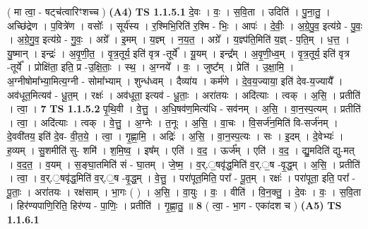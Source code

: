 \documentclass[17pt]{extarticle}
\begin{document}
                  \newline
                      ( मा त्वा॒ - षट्च॑त्वारिꣳशच्च )  \textbf{(A4)} \newline \newline
                                \textbf{ TS 1.1.5.1} \newline
                  दे॒वः । वः॒ । स॒वि॒ता । उदिति॑ । पु॒ना॒तु॒ । अच्छि॑द्रेण । प॒वित्रे॑ण । वसोः᳚ । सूर्य॑स्य । र॒श्मिभि॒रिति॑ र॒श्मि - भिः॒ । आपः॑ । दे॒वीः॒ । अ॒ग्रे॒पु॒व॒ इत्य॑ग्रे - पु॒वः॒ । अ॒ग्रे॒गु॒व॒ इत्य॑ग्रे - गु॒वः॒ । अग्रे᳚ । इ॒मम् । य॒ज्ञ्म् । न॒य॒त॒ । अग्रे᳚ । य॒ज्ञ्प॑ति॒मिति॑ य॒ज्ञ् - प॒ति॒म् । ध॒त्त॒ । यु॒ष्मान् । इन्द्रः॑ । अ॒वृ॒णी॒त॒ । वृ॒त्र॒तूर्य॒ इति॑ वृत्र -तूर्ये᳚ । यू॒यम् । इन्द्र᳚म् । अ॒वृ॒णी॒ध्व॒म् । वृ॒त्र॒तूर्य॒ इति॑ वृत्र -तूर्ये᳚ । प्रोक्षि॑ता॒ इति॒ प्र -उ॒क्षि॒ताः॒ । स्थ॒ । अ॒ग्नये᳚ । वः॒ । जुष्ट᳚म् । प्रेति॑ । उ॒क्षा॒मि॒ । अ॒ग्नीषोमा᳚भ्या॒मित्य॒ग्नी - सोमा᳚भ्याम् । शुन्ध॑ध्वम् । दैव्या॑य । कर्म॑णे । दे॒व॒य॒ज्याया॒ इति॑ देव-य॒ज्यायै᳚ । अव॑धूत॒मित्यव॑ - धू॒त॒म् । रक्षः॑ । अव॑धूता॒ इत्यव॑ - धू॒ताः॒ । अरा॑तयः । अदि॑त्याः । त्वक् । अ॒सि॒ । प्रतीति॑ । त्वा॒ । \textbf{  7} \newline
                  \newline
                                \textbf{ TS 1.1.5.2} \newline
                  पृ॒थि॒वी । वे॒त्तु॒ । अ॒धि॒षव॑ण॒मित्य॑धि - सव॑नम् । अ॒सि॒ । वा॒न॒स्प॒त्यम् । प्रतीति॑ । त्वा॒ । अदि॑त्याः । त्वक् । वे॒त्तु॒ । अ॒ग्नेः । त॒नूः । अ॒सि॒ । वा॒चः । वि॒सर्ज॑न॒मिति॑ वि-सर्ज॑नम् । दे॒ववी॑तय॒ इति॑ दे॒व- वी॒त॒ये॒ । त्वा॒ । गृ॒ह्णा॒मि॒ । अद्रिः॑ । अ॒सि॒ । वा॒न॒स्प॒त्यः । सः । इ॒दम् । दे॒वेभ्यः॑ । ह॒व्यम् । सु॒शमीति॑ सु- शमि॑ । श॒मि॒ष्व॒ । इष᳚म् । एति॑ । व॒द॒ । ऊर्ज᳚म् । एति॑ । व॒द॒ । द्यु॒मदिति॑ द्यु-मत् । व॒द॒त॒ । व॒यम् । स॒ङ्घा॒तमिति॑ सं - घा॒तम् । जे॒ष्म॒ । व॒र्.॒षवृ॑द्ध॒मिति॑ व॒र्.॒ष -वृ॒द्ध॒म् । अ॒सि॒ । प्रतीति॑ । त्वा॒ । व॒र्.॒षवृ॑द्ध॒मिति॑ व॒र्.॒ष -वृ॒द्ध॒म् । वे॒त्तु॒ । परा॑पूत॒मिति॒ परा᳚ - पू॒त॒म् । रक्षः॑ । परा॑पूता॒ इति॒ परा᳚ - पू॒ताः॒ । अरा॑तयः । रक्ष॑साम् । भा॒गः ( ) । अ॒सि॒ । वा॒युः । वः॒ । वीति॑ । वि॒न॒क्तु॒ । दे॒वः । वः॒ । स॒वि॒ता । हिर॑ण्यपाणि॒रिति॒ हिर॑ण्य - पा॒णिः॒ । प्रतीति॑ । गृ॒ह्णा॒तु॒ ॥ \textbf{  8 } \newline
                  \newline
                      ( त्वा॒ - भा॒ग - एका॑दश च )  \textbf{(A5)} \newline \newline
                                \textbf{ TS 1.1.6.1} \newline
\end{document}
